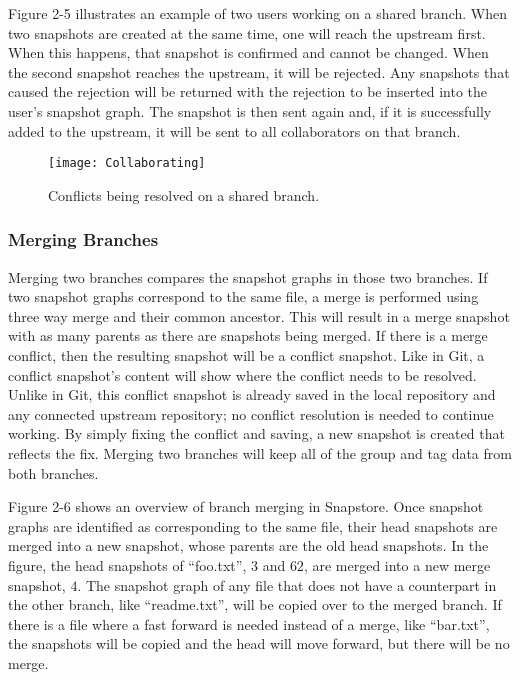 Figure 2-5 illustrates an example of two users working on a shared branch. When two snapshots are created at the same time, one will reach the upstream first. When this happens, that snapshot is confirmed and cannot be changed. When the second snapshot reaches the upstream, it will be rejected. Any snapshots that caused the rejection will be returned with the rejection to be inserted into the user's snapshot graph. The snapshot is then sent again and, if it is successfully added to the upstream, it will be sent to all collaborators on that branch.

\begin{figure}
\texttt{[image: Collaborating]}
\caption{Conflicts being resolved on a shared branch.}
\label{arm:fig1}
\end{figure}

\subsubsection{Merging Branches}

Merging two branches compares the snapshot graphs in those two branches. If two snapshot graphs correspond to the same file, a merge is performed using three way merge and their common ancestor. This will result in a merge snapshot with as many parents as there are snapshots being merged. If there is a merge conflict, then the resulting snapshot will be a conflict snapshot. Like in Git, a conflict snapshot's content will show where the conflict needs to be resolved. Unlike in Git, this conflict snapshot is already saved in the local repository and any connected upstream repository; no conflict resolution is needed to continue working. By simply fixing the conflict and saving, a new snapshot is created that reflects the fix. Merging two branches will keep all of the group and tag data from both branches.

Figure 2-6 shows an overview of branch merging in Snapstore. Once snapshot graphs are identified as corresponding to the same file, their head snapshots are merged into a new snapshot, whose parents are the old head snapshots. In the figure, the head snapshots of ``foo.txt'', $3$ and $62$, are merged into a new merge snapshot, $4$. The snapshot graph of any file that does not have a counterpart in the other branch, like ``readme.txt'', will be copied over to the merged branch. If there is a file where a fast forward is needed instead of a merge, like ``bar.txt'', the snapshots will be copied and the head will move forward, but there will be no merge. 

